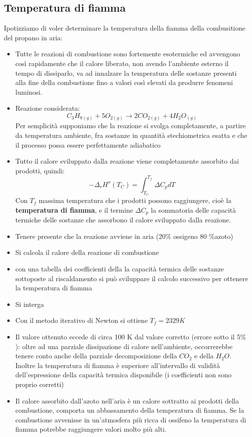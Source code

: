 \documentclass{article}
\begin{document}
\subsection{Temperatura di fiamma}
Ipotizziamo di voler determinare la temperatura della fiamma della combusitione del propano in aria:
\begin{itemize}
    \item Tutte le reazioni di combustione sono fortemente esotermiche ed avvengono così rapidamente che il calore liberato, non avendo l'ambiente esterno il tempo di dissiparlo, va ad innalzare la temperatura delle sostanze presenti alla fine della combustione fino a valori così elevati da produrre fenomeni luminosi.
    \item Reazione considerata:
        \begin{equation*}
            C_3H_{8 (g)}+5O_{2(g)}\rightarrow 2CO_{2(g)}+4H_2O_{(g)}
        \end{equation*}
    Per semplicità supponiamo che la reazione si svolga completamente, a partire da temperatura ambiente, fra sostanze in quantità stechiometrica esatta e che il processo possa essere perfettamente adiabatico
    \item Tutto il calore sviluppato dalla reazione viene completamente assorbito dai prodotti, quindi:
    \begin{equation*}
        -\Delta_rH^o(T_C)=\int_{T_C}^{T_f}\Delta C_pdT
    \end{equation*}
    Con $T_f$ massima temperatura che i prodotti possono raggiungere, cioè la \textbf{temperatura di fiamma}, e il termine $\Delta C_p$ la sommatoria delle capacità termiche delle sostanze che assorbono il calore sviluppato dalla reazione.
    \item Tenere presente che la reazione avviene in aria (20$\%$ ossigeno 80 $\%$azoto)
    \item Si calcola il calore della reazione di combustione
    \item con una tabella dei coefficienti della la capacità termica delle sostanze sottoposte al riscaldamento si può sviluppare il calcolo successivo per ottenere la temperatura di fiamma
    \item Si interga
    \item Con il metodo iterativo di Newton si ottiene $T_f=2329K$
    \item Il valore ottenuto eccede di circa 100 K dal valore corretto (errore sotto il 5$\%$): oltre ad una parziale dissipazione di calore nell'ambiente, occorrerebbe tenere conto anche della parziale decomposizione della $CO_2$ e della $H_2O$. Inoltre la temperatura di fiamma è superiore all'intervallo di validità dell'espressione della capacità termica disponibile (i coefficienti non sono proprio corretti)
    \item Il calore assorbito dall'azoto nell'aria è un calore sottratto ai prodotti della combustione, comporta un abbassamento della temperatura di fiamma. Se la combustione avvenisse in un'atmosfera più ricca di ossifeno la temperatura di fiamma potrebbe raggiungere valori molto più alti.
\end{itemize}
\end{document}
